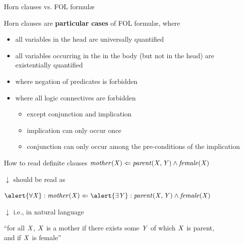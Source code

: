 \documentclass[presentation]{beamer}\mode<presentation>{\usetheme{AMSBolognaFC}}
\begin{document}
\begin{frame}[allowframebreaks]{Horn clauses vs. FOL formul\ae}
    \begin{block}{Horn clauses are \textbf{particular cases} of FOL formul\ae, where}
        \begin{itemize}
            \item all variables in the head are \alert{universally} quantified
            \item all variables occurring in the in the body (but not in the head) are \alert{existentially} quantified
            \item where negation of predicates is forbidden
            \item where all logic connectives are forbidden
            \begin{itemize}
                \item except conjunction and implication
                \item implication can only occur once
                \item conjunction can only occur among the pre-conditions of the implication
            \end{itemize}
        \end{itemize}
    \end{block}

    \begin{exampleblock}{How to read definite clauses}
        \centering
        $\text{\textit{mother}}(\mathit{X}) \Leftarrow \text{\textit{parent}}(\mathit{X}, \mathit{Y}) \wedge \text{\textit{female}}(\mathit{X})$

        \medskip

        $\downarrow$ {\footnotesize should be read as}

        \medskip

        $\alert{\forall \variable{X}} : \predication{mother}(\variable{X}) \Leftarrow \alert{\exists \variable{Y}} : \predication{parent}(\variable{X}, \variable{Y}) \wedge \predication{female}(\variable{X})$

        \medskip

        $\downarrow$ {\footnotesize i.e., in natural language}

        \medskip

        ``for all $\mathit{X}$, $\mathit{X}$ is a mother if there exists some $\mathit{Y}$ of which $\mathit{X}$ is parent, \\ and if $\mathit{X}$ is female''
    \end{exampleblock}
\end{frame}
\end{document}
